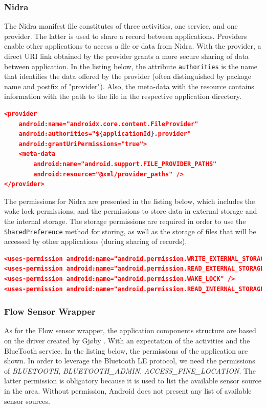 \subsubsection{Nidra}

The Nidra manifest file constitutes of three activities, one service, and one provider. The latter is used to share a record between applications. Providers enable other applications to access a file or data from Nidra. With the provider, a direct URI link obtained by the provider grants a more secure sharing of data between application. In the listing below, the attribute \verb|authorities| is the name that identifies the data offered by the provider (often distinguished by package name and postfix of "provider"). Also, the meta-data with the resource contains information with the path to the file in the respective application directory.  

\begin{lstlisting}[language=json, caption={}, captionpos=b]
<provider
    android:name="androidx.core.content.FileProvider"
    android:authorities="${applicationId}.provider"
    android:grantUriPermissions="true">
    <meta-data
        android:name="android.support.FILE_PROVIDER_PATHS"
        android:resource="@xml/provider_paths" />
</provider>
\end{lstlisting}

The permissions for Nidra are presented in the listing below, which includes the wake lock permissions, and the permissions to store data in external storage and the internal storage. The storage permissions are required in order to use the \verb|SharedPreference| method for storing, as well as the storage of files that will be accessed by other applications (during sharing of records).

\begin{lstlisting}[language=json, caption={}, captionpos=b]
<uses-permission android:name="android.permission.WRITE_EXTERNAL_STORAGE" />
<uses-permission android:name="android.permission.READ_EXTERNAL_STORAGE" />
<uses-permission android:name="android.permission.WAKE_LOCK" />
<uses-permission android:name="android.permission.READ_INTERNAL_STORAGE" />
\end{lstlisting}

\subsubsection{Flow Sensor Wrapper}

As for the Flow sensor wrapper, the application components structure are based on the driver created by Gjøby \cite{gjoby}. With an expectation of the activities and the BlueTooth service. In the listing below, the permissions of the application are shown. In order to leverage the Bluetooth LE protocol, we need the permissions of \textit{BLUETOOTH}, \textit{BLUETOOTH\_ADMIN}, \textit{ACCESS\_FINE\_LOCATION}. The latter permission is obligatory because it is used to list the available sensor source in the area. Without permission, Android does not present any list of available sensor sources. 

